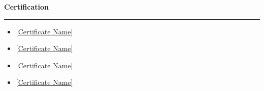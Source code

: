 \documentclass[9pt,letterpaper]{article} %
\newenvironment{rSection}[1]{ %
  \sectionskip
 \textbf{\Large #1} %
  \sectionlineskip
  \hrule %
  \begin{list}{}{ %
    \setlength{\leftmargin}{-0em} %
  }
  \item[]
}{
  \end{list}
}
\def\sectionlineskip{\smallskip} %
\def\sectionskip{} %
\begin{document}
\begin{rSection}{Certification}
\item[] \vspace{-1em}
\begin{itemize}[left=-1.5em, labelwidth=.1cm, itemsep=0.0em]
\item \href{[Certificate URL]}{[Certificate Name]}
\item \href{[Certificate URL]}{[Certificate Name]}
\item \href{[Certificate URL]}{[Certificate Name]}
\item \href{[Certificate URL]}{[Certificate Name]}
\end{itemize}
\end{rSection}
\end{document}
